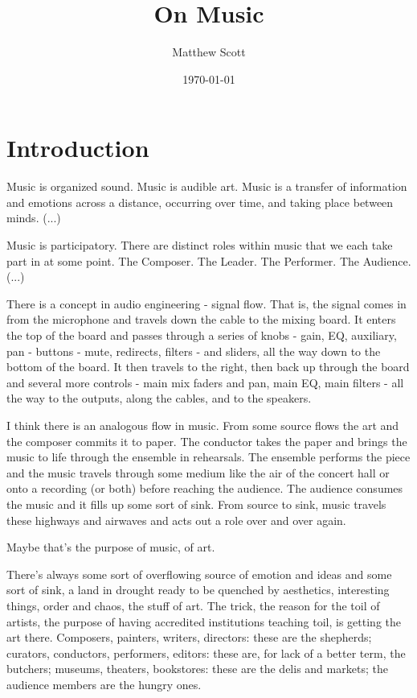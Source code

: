 \documentclass{book}
\begin{document}
\frontmatter
\title{On Music}
\author{Matthew Scott}
\date{\today}
\maketitle

\chapter*{Introduction}
Music is organized sound.  Music is audible art.  Music is a transfer of information and emotions across a distance, occurring over time, and taking place between minds. (...)

Music is participatory.  There are distinct roles within music that we each take part in at some point.  The Composer.  The Leader.  The Performer.  The Audience. (...)

There is a concept in audio engineering - signal flow.  That is, the signal comes in from the microphone and travels down the cable to the mixing board.  It enters the top of the board and passes through a series of knobs - gain, EQ, auxiliary, pan - buttons - mute, redirects, filters - and sliders, all the way down to the bottom of the board.  It then travels to the right, then back up through the board and several more controls - main mix faders and pan, main EQ, main filters - all the way to the outputs, along the cables, and to the speakers.

I think there is an analogous flow in music.  From some source flows the art and the composer commits it to paper.  The conductor takes the paper and brings the music to life through the ensemble in rehearsals.  The ensemble performs the piece and the music travels through some medium like the air of the concert hall or onto a recording (or both) before reaching the audience.  The audience consumes the music and it fills up some sort of sink.  From source to sink, music travels these highways and airwaves and acts out a role over and over again.

Maybe that's the purpose of music, of art.

There's always some sort of overflowing source of emotion and ideas and some sort of sink, a land in drought ready to be quenched by aesthetics, interesting things, order and chaos, the stuff of art.  The trick, the reason for the toil of artists, the purpose of having accredited institutions teaching toil, is getting the art there.  Composers, painters, writers, directors: these are the shepherds; curators, conductors, performers, editors: these are, for lack of a better term, the butchers; museums, theaters, bookstores: these are the delis and markets; the audience members are the hungry ones.
\end{document}
